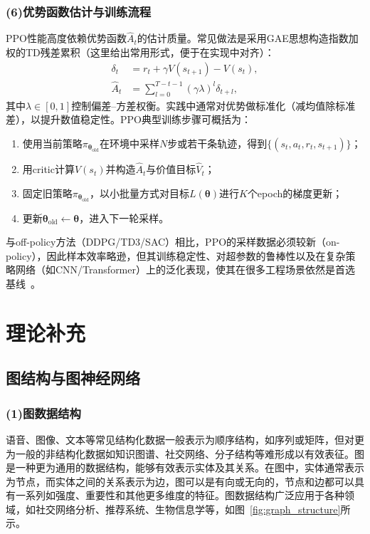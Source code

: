   \subsubsection*{(6)优势函数估计与训练流程}
    PPO性能高度依赖优势函数$\hat{A}_t$的估计质量。常见做法是采用GAE思想构造指数加权的TD残差累积（这里给出常用形式，便于在实现中对齐）：
    \begin{align}
    \delta_t &= r_t + \gamma V(s_{t+1})-V(s_t),\\
    \hat{A}_t &= \sum_{l=0}^{T-t-1}(\gamma\lambda)^l \delta_{t+l},
    \end{align}
    其中$\lambda\in[0,1]$控制偏差--方差权衡。实践中通常对优势做标准化（减均值除标准差），以提升数值稳定性。PPO典型训练步骤可概括为：
    \begin{enumerate}
    \item 使用当前策略$\pi_{\bm{\theta}_{\text{old}}}$在环境中采样$N$步或若干条轨迹，得到$\{(s_t,a_t,r_t,s_{t+1})\}$；
    \item 用critic计算$V(s_t)$并构造$\hat{A}_t$与价值目标$\hat{V}_t$；
    \item 固定旧策略$\pi_{\bm{\theta}_{\text{old}}}$，以小批量方式对目标$L(\bm{\theta})$进行$K$个epoch的梯度更新；
    \item 更新$\bm{\theta}_{\text{old}}\leftarrow \bm{\theta}$，进入下一轮采样。
    \end{enumerate}
    与off-policy方法（DDPG/TD3/SAC）相比，PPO的采样数据必须较新（on-policy），因此样本效率略逊，但其训练稳定性、对超参数的鲁棒性以及在复杂策略网络（如CNN/Transformer）上的泛化表现，使其在很多工程场景依然是首选基线~\cite{PPO_2017}。

\section{理论补充}


  \subsection{图结构与图神经网络}

    \subsubsection*{(1)图数据结构}
      语音、图像、文本等常见结构化数据一般表示为顺序结构，如序列或矩阵，但对更为一般的非结构化数据如知识图谱、社交网络、分子结构等难形成以有效表征。图是一种更为通用的数据结构，能够有效表示实体及其关系。在图中，实体通常表示为节点，而实体之间的关系表示为边，图可以是有向或无向的，节点和边都可以具有一系列如强度、重要性和其他更多维度的特征。图数据结构广泛应用于各种领域，如社交网络分析、推荐系统、生物信息学等，如图~\ref{fig:graph_structure}所示。

